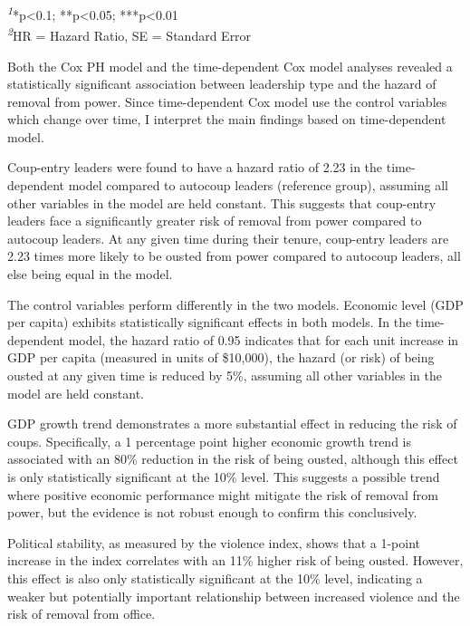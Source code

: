 \documentclass[
  12pt,
]{report}
\begin{document}
\begin{minipage}{\linewidth}
\textsuperscript{\textit{1}}*p\textless{}0.1; **p\textless{}0.05; ***p\textless{}0.01\\
\textsuperscript{\textit{2}}HR = Hazard Ratio, SE = Standard Error\\
\end{minipage}
\endgroup

Both the Cox PH model and the time-dependent Cox model analyses revealed
a statistically significant association between leadership type and the
hazard of removal from power. Since time-dependent Cox model use the
control variables which change over time, I interpret the main findings
based on time-dependent model.

Coup-entry leaders were found to have a hazard ratio of 2.23 in the
time-dependent model compared to autocoup leaders (reference group),
assuming all other variables in the model are held constant. This
suggests that coup-entry leaders face a significantly greater risk of
removal from power compared to autocoup leaders. At any given time
during their tenure, coup-entry leaders are 2.23 times more likely to be
ousted from power compared to autocoup leaders, all else being equal in
the model.

The control variables perform differently in the two models. Economic
level (GDP per capita) exhibits statistically significant effects in
both models. In the time-dependent model, the hazard ratio of 0.95
indicates that for each unit increase in GDP per capita (measured in
units of \$10,000), the hazard (or risk) of being ousted at any given
time is reduced by 5\%, assuming all other variables in the model are
held constant.

GDP growth trend demonstrates a more substantial effect in reducing the
risk of coups. Specifically, a 1 percentage point higher economic growth
trend is associated with an 80\% reduction in the risk of being ousted,
although this effect is only statistically significant at the 10\%
level. This suggests a possible trend where positive economic
performance might mitigate the risk of removal from power, but the
evidence is not robust enough to confirm this conclusively.

Political stability, as measured by the violence index, shows that a
1-point increase in the index correlates with an 11\% higher risk of
being ousted. However, this effect is also only statistically
significant at the 10\% level, indicating a weaker but potentially
important relationship between increased violence and the risk of
removal from office.
\end{document}

